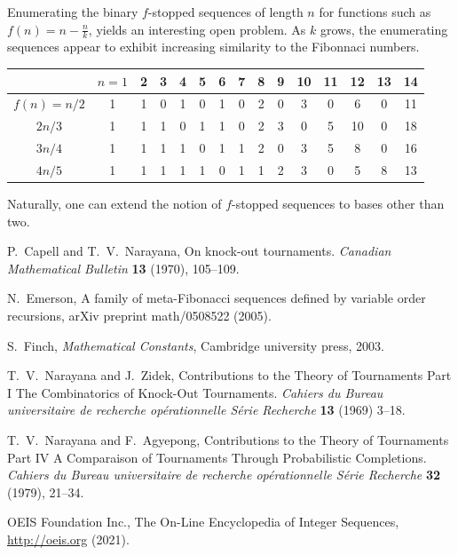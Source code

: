 \documentclass[12pt]{article}
\theoremstyle{definition}
\begin{document}
Enumerating the binary $f$-stopped sequences of length $n$ for functions such as $f(n) = n - \frac{n}{k}$, yields an interesting open problem.
As $k$ grows, the enumerating sequences appear to exhibit increasing similarity to the Fibonnaci numbers.

\begin{tabular}{| c | c | c | c | c | c | c | c | c | c | c | c | c | c | c |}
\hline
 & $n=1$ & 2 & 3 & 4 & 5 & 6 & 7 & 8 & 9 & 10 & 11 & 12 & 13 & 14 \\
\hline
$f(n) = n/2$ & 1 & 1 & 0 & 1 & 0 & 1 & 0 & 2 & 0 & 3 & 0 & 6 & 0 & 11\\
\hline
$2n/3$ & 1 & 1 & 1 & 0 & 1 & 1 & 0 & 2 & 3 & 0 & 5 & 10 & 0 & 18 \\
\hline
$3n/4$ & 1 & 1 & 1 & 1 & 0 & 1 & 1 & 2 & 0 & 3 & 5 & 8 & 0 & 16 \\
\hline
$4n/5$ & 1 & 1 & 1 & 1 & 1 & 0 & 1 & 1 & 2 & 3 & 0 & 5 & 8 & 13\\
\hline
\end{tabular}
 
Naturally, one can extend the notion of $f$-stopped sequences to bases other than two. 

\begin{thebibliography}{1}

P.~Capell and T.~V.~Narayana, On knock-out tournaments. \emph{Canadian
Mathematical Bulletin} \textbf{13} (1970), 105--109.

N.~Emerson, A family of meta-Fibonacci sequences defined by variable order
recursions, arXiv preprint math/0508522 (2005).

S.~Finch, \emph{Mathematical Constants}, Cambridge university press, 2003.

T.~V.~Narayana and J.~Zidek, Contributions to the Theory of Tournaments Part I
The Combinatorics of Knock-Out Tournaments. \emph{Cahiers du Bureau
universitaire de recherche op\'erationnelle S\'erie Recherche} \textbf{13}
(1969) 3--18.

T.~V.~Narayana and F.~Agyepong, Contributions to the Theory of Tournaments Part
IV A Comparaison of Tournaments Through Probabilistic Completions.
\emph{Cahiers du Bureau universitaire de recherche op\'erationnelle S\'erie
Recherche} \textbf{32} (1979), 21--34.

OEIS Foundation Inc., The On-Line Encyclopedia of Integer Sequences,
\url{http://oeis.org} (2021).

\end{thebibliography}
\end{document}

